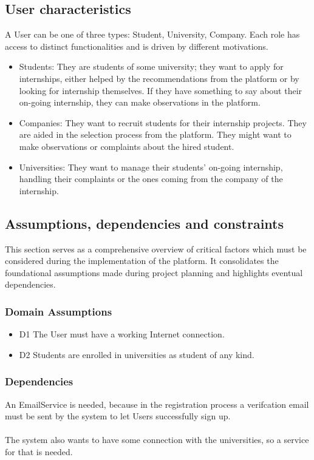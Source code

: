 \documentclass{article}
\begin{document}
\subsection{User characteristics}
     A User can be one of three types: Student, University, Company. Each role has access to distinct functionalities and is driven by different motivations.
     \begin{itemize}
        \item Students: They are students of some university; they want to apply for internships, either helped by the recommendations from the platform or by looking for internship themselves. If they have something to say about their on-going internship, they can make observations in the platform.
        \item Companies: They want to recruit students for their internship projects. They are aided in the selection process from the platform. They might want to make observations or complaints about the hired student.
        \item Universities: They want to manage their students' on-going internship, handling their complaints or the ones coming from the company of the internship.     
     \end{itemize}
\subsection{Assumptions, dependencies and constraints}
This section serves as a comprehensive overview of critical factors which must be considered during the implementation of the platform. It consolidates the foundational assumptions made during project planning and highlights eventual dependencies.
\subsubsection{Domain Assumptions}
    \begin{itemize}
        \item D1 The User must have a working Internet connection.
        \item D2 Students are enrolled in universities as student of any kind.
    \end{itemize}
\subsubsection{Dependencies}
An EmailService is needed, because in the registration process a verifcation email must be sent by the system to let Users successfully sign up.\\ \\The system also wants to have some connection with the universities, so a service for that is needed.
\end{document}
